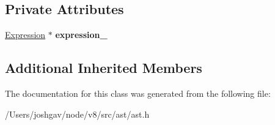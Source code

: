 \subsection*{Private Attributes}
\begin{DoxyCompactItemize}
\item 
\hyperlink{classv8_1_1internal_1_1_expression}{Expression} $\ast$ {\bfseries expression\+\_\+}\hypertarget{classv8_1_1internal_1_1_return_statement_a4a6dd3b6b6300344a70d2d34a2dd091b}{}\label{classv8_1_1internal_1_1_return_statement_a4a6dd3b6b6300344a70d2d34a2dd091b}

\end{DoxyCompactItemize}
\subsection*{Additional Inherited Members}


The documentation for this class was generated from the following file\+:\begin{DoxyCompactItemize}
\item 
/\+Users/joshgav/node/v8/src/ast/ast.\+h\end{DoxyCompactItemize}
